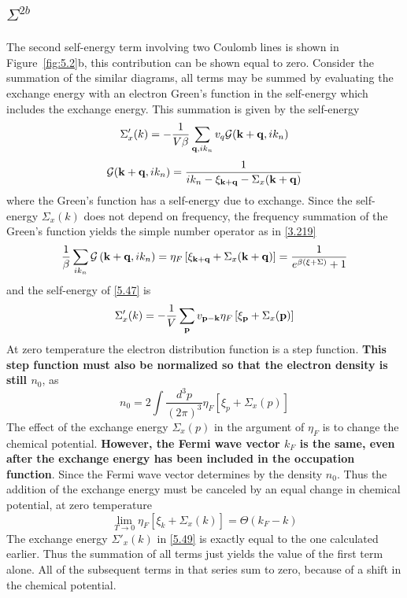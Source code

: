 \subsection{$\Sigma^{2b}$}
The second self-energy term involving two Coulomb lines is shown in Figure~\ref{fig:5.2}b, this contribution can be shown equal to zero.
Consider the summation of the similar diagrams, all terms may be summed by evaluating the exchange energy with an electron Green's function in the self-energy which includes the exchange energy.
This summation is given by the self-energy
\begin{equation}
    \Sigma'_x(k) = - \frac{1}{V\beta} \sum_{\mathbf{q},ik_n} v_q \mathcal{G}(\mathbf{k}+\mathbf{q},ik_n) \label{5.47}
\end{equation}
\begin{equation}
    \mathcal{G} (\mathbf{k}+\mathbf{q},ik_n) = \frac{1}{ik_n - \xi_{\mathbf{k}+\mathbf{q}} -\Sigma_x(\mathbf{k}+\mathbf{q})} \label{5.48}
\end{equation}
where the Green's function has a self-energy due to exchange.
Since the self-energy $\Sigma_x(k)$ does not depend on frequency, the frequency summation of the Green's function yields the simple number operator as in \eqref{3.219}
\begin{equation}
    \frac{1}{\beta}  \sum_{ik_n} \mathcal{G} \left(\mathbf{k} + \mathbf{q}, ik_n\right) = \eta_F\left[ \xi_{\mathbf{k}+\mathbf{q}} + \Sigma_x(\mathbf{k}+\mathbf{q})  \right] = \frac{1}{e^{\beta(\xi+\Sigma)}+1}
\end{equation}
and the self-energy of \eqref{5.47} is
\begin{equation}
    \Sigma'_x (k) = - \frac{1}{V} \sum_{\mathbf{p}} v_{\mathbf{p}-\mathbf{k}} \eta_F \left[ \xi_{\mathbf{p}} + \Sigma_x(\mathbf{p})  \right]  \label{5.49}
\end{equation}
At zero temperature the electron distribution function is a step function.
\textbf{This step function must also be normalized so that the electron density is still $n_0$}, as
\begin{equation}
    n_0 = 2 \int \frac{d^3 p}{(2\pi)^3} \eta_F \left[ \xi_p + \Sigma_x(p) \right]   \label{5.50}
\end{equation}
The effect of the exchange energy $\Sigma_x(p)$ in the argument of $\eta_F$ is to change the chemical potential.
\textbf{However, the Fermi wave vector $k_F$ is the same, even after the exchange energy has been included in the occupation function}.
Since the Fermi wave vector determines by the density $n_0$.
Thus the addition of the exchange energy must be canceled by an equal change in chemical potential, at zero temperature
\begin{equation}
    \lim_{T\to 0} \eta_F\left[ \xi_k + \Sigma_x (k) \right] = \Theta ( k_F - k)   \label{5.51}
\end{equation}
The exchange energy $\Sigma'_x(k)$ in \eqref{5.49} is exactly equal to the one calculated earlier.
Thus the summation of all terms just yields the value of the first term alone.
All of the subsequent terms in that series sum to zero, because of a shift in the chemical potential.

